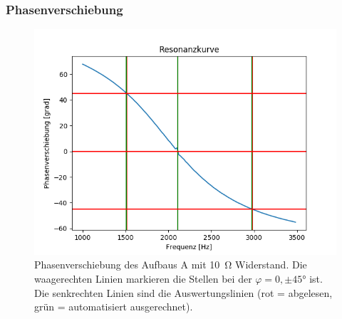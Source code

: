 \documentclass[12pt,a4paper]{article}
\begin{document}
\subsubsection{Phasenverschiebung}
\begin{figure}[H]
	\centering
	\includegraphics[scale=0.7]{Bilder/Serie_Phasenverschiebung_A_10.png}
	\caption{Phasenverschiebung des Aufbaus A mit \SI{10}{\ohm} Widerstand. Die waagerechten Linien markieren die Stellen bei der $\varphi = 0, \pm \ang{45}$ ist. Die senkrechten Linien sind die Auswertungslinien (rot = abgelesen, grün = automatisiert ausgerechnet).}
	\label{fig:Serie_Phasenverschiebung_A_10}
\end{figure}
\end{document}
